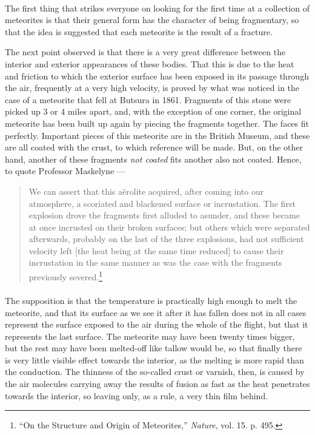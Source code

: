 \documentclass[a4paper, 12pt, oneside, polutonikogreek, english]{article}
\begin{document}
\paragraph{}
The first thing that strikes everyone on looking for the first time at a collection of meteorites is that their general form has the character of being fragmentary, so that the idea is suggested that each meteorite is the result of a fracture.

The next point observed is that there is a very great difference between the interior and exterior appearances of these bodies. That this is due to the heat and friction to which the exterior surface has been exposed in its passage through the air, frequently at a very high velocity, is proved by what was noticed in the case of a meteorite that fell at Butsura in 1861. Fragments of this stone were picked up 3 or 4 miles apart, and, with the exception of one corner, the original meteorite has been built up again by piecing the fragments together. The faces fit perfectly. Important pieces of this meteorite are in the British Museum, and these are all coated with the crust, to which reference will be made. But, on the other hand, another of these fragments \emph{not coated} fits another also not coated. Hence, to quote Professor Maskelyne ---
\begin{quotation}
We can assert that this aërolite acquired, after coming into our atmosphere, a scoriated and blackened surface or incrustation. The first explosion drove the fragments first alluded to asunder, and these became at once incrusted on their broken surfaces; but others which were separated afterwards, probably on the last of the three explosions, had not sufficient velocity left [the heat being at the same time reduced] to cause their incrustation in the same manner as was the case with the fragments previously severed.\footnote{``On the Structure and Origin of Meteorites,'' \emph{Nature}, vol. 15. p. 495.}
\end{quotation}
\paragraph{}
The supposition is that the temperature is practically high enough to melt the meteorite, and that its surface as we see it after it has fallen does not in all cases represent the surface exposed to the air during the whole of the flight, but that it represents the last surface. The meteorite may have been twenty times bigger, but the rest may have been melted-off like tallow would be, so that finally there is very little visible effect towards the interior, as the melting is more rapid than the conduction. The thinness of the so-called crust or varnish, then, is caused by the air molecules carrying away the results of fusion as fast as the heat penetrates towards the interior, so leaving only, as a rule, a very thin film behind.
\end{document}
